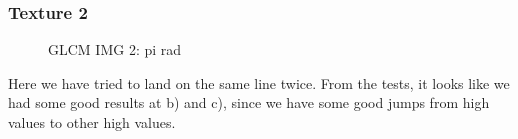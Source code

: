 \documentclass{article}
\begin{document}
	\subsubsection{Texture 2}
		\begin{figure}[h]%
			\centering
    		\qquad
    		\qquad
    		\qquad

    		\caption{GLCM IMG 2: pi rad}%
    		\label{fig:GLCM_2}%
		\end{figure}
		Here we have tried to land on the same line twice. From the tests, it looks like we had some good results at b) and c), since we have some good jumps from high values to other high values.
\newpage
\end{document}
